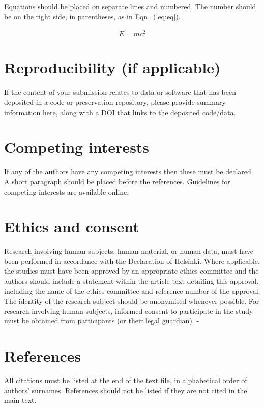 \documentclass{article}
\begin{document}
Equations should be placed on separate lines and numbered.
The number should be on the right side, in parentheses,
as in Eqn.~(\ref{eq:eq}).

\begin{align}\label{eq:eq}
E = mc^2
\end{align}

\section{Reproducibility (if applicable)}

If the content of your submission relates to data or software
that has been deposited in a code or preservation repository,
please provide summary information here, along with a DOI that
links to the deposited code/data.

\section{Competing interests}

If any of the authors have any competing interests then these
must be declared. A short paragraph should be placed before
the references.
Guidelines for competing interests are available online.%

\section{Ethics and consent}

Research involving human subjects, human material, or human data,
must have been performed in accordance with the Declaration of Helsinki.
Where applicable, the studies must have been approved by an appropriate
ethics committee and the authors should include a statement within
the article text detailing this approval, including the name of the ethics committee and reference number of the approval.
The identity of the research subject should be anonymised whenever possible.
For research involving human subjects, informed consent to participate
in the study must be obtained from participants (or their legal guardian).
-


\section{References}

All citations must be listed at the end of the text file,
in alphabetical order of authors' surnames.
References should not be listed if they are not cited in
the main text.
\end{document}
